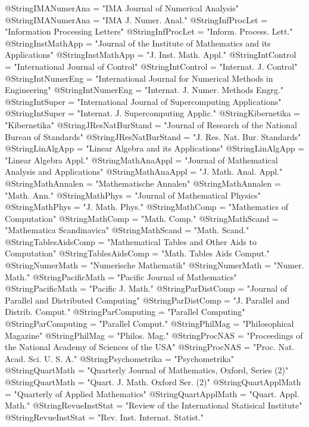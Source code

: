  @String{IMANumerAna = "{IMA} Journal of Numerical Analysis" }
 @String{IMANumerAna = "{IMA} J. Numer. Anal." }
 @String{InfProcLet = "Information Processing Letters" }
 @String{InfProcLet = "Inform. Process. Lett." }
 @String{InstMathApp = "Journal of the Institute of Mathematics and
     its Applications" }
 @String{InstMathApp = "J. Inst. Math. Appl." }
 @String{IntControl = "International Journal of Control" }
 @String{IntControl = "Internat. J. Control" }
 @String{IntNumerEng = "International Journal for Numerical Methods in
     Engineering" }
 @String{IntNumerEng = "Internat. J. Numer. Methods Engrg." }
 @String{IntSuper = "International Journal of Supercomputing Applications" }
 @String{IntSuper = "Internat. J. Supercomputing Applic." } %
 @String{Kibernetika = "Kibernetika" }
 @String{JResNatBurStand = "Journal of Research of the National Bureau
     of Standards" }
 @String{JResNatBurStand = "J. Res. Nat. Bur. Standards" }
 @String{LinAlgApp = "Linear Algebra and its Applications" }
 @String{LinAlgApp = "Linear Algebra Appl." }
 @String{MathAnaAppl = "Journal of Mathematical Analysis and Applications" }
 @String{MathAnaAppl = "J. Math. Anal. Appl." }
 @String{MathAnnalen = "Mathematische Annalen" }
 @String{MathAnnalen = "Math. Ann." }
 @String{MathPhys = "Journal of Mathematical Physics" }
 @String{MathPhys = "J. Math. Phys." }
 @String{MathComp = "Mathematics of Computation" }
 @String{MathComp = "Math. Comp." }
 @String{MathScand = "Mathematica Scandinavica" }
 @String{MathScand = "Math. Scand." }
 @String{TablesAidsComp = "Mathematical Tables and Other Aids to Computation" }
 @String{TablesAidsComp = "Math. Tables Aids Comput." }
 @String{NumerMath = "Numerische Mathematik" }
 @String{NumerMath = "Numer. Math." }
 @String{PacificMath = "Pacific Journal of Mathematics" }
 @String{PacificMath = "Pacific J. Math." }
 @String{ParDistComp = "Journal of Parallel and Distributed Computing" }
 @String{ParDistComp = "J. Parallel and Distrib. Comput." } %
 @String{ParComputing = "Parallel Computing" }
 @String{ParComputing = "Parallel Comput." }
 @String{PhilMag = "Philosophical Magazine" }
 @String{PhilMag = "Philos. Mag." }
 @String{ProcNAS = "Proceedings of the National Academy of Sciences
                    of the USA" }
 @String{ProcNAS = "Proc. Nat. Acad. Sci. U. S. A." }
 @String{Psychometrika = "Psychometrika" }
 @String{QuartMath = "Quarterly Journal of Mathematics, Oxford, Series (2)" }
 @String{QuartMath = "Quart. J. Math. Oxford Ser. (2)" }
 @String{QuartApplMath = "Quarterly of Applied Mathematics" }
 @String{QuartApplMath = "Quart. Appl. Math." }
 @String{RevueInstStat = "Review of the International Statisical Institute" }
 @String{RevueInstStat = "Rev. Inst. Internat. Statist." }

